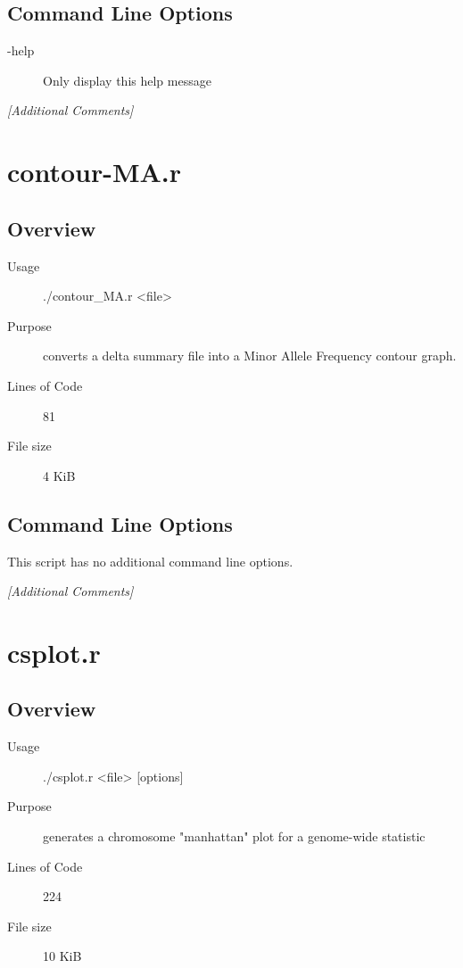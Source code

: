 \subsection{Command Line Options}
\label{sec:bs2meancalc.r-command-line}

\begin{description}
\item[-help] Only display this help message
\end{description}

\emph{[Additional Comments]}

\section{contour-MA.r}
\label{sec:contour-MA.r}

\subsection{Overview}
\label{sec:contour-MA.r-overview}

\begin{description}
\item[Usage] ./contour_MA.r <file>
\item[Purpose] converts a delta summary file into a Minor Allele Frequency contour graph.
\item[Lines of Code] 81
\item[File size] 4 KiB
\end{description}

\subsection{Command Line Options}
\label{sec:contour-MA.r-command-line}

This script has no additional command line options.

\emph{[Additional Comments]}

\section{csplot.r}
\label{sec:csplot.r}

\subsection{Overview}
\label{sec:csplot.r-overview}

\begin{description}
\item[Usage] ./csplot.r <file> [options]
\item[Purpose] generates a chromosome "manhattan" plot for a genome-wide statistic
\item[Lines of Code] 224
\item[File size] 10 KiB
\end{description}

